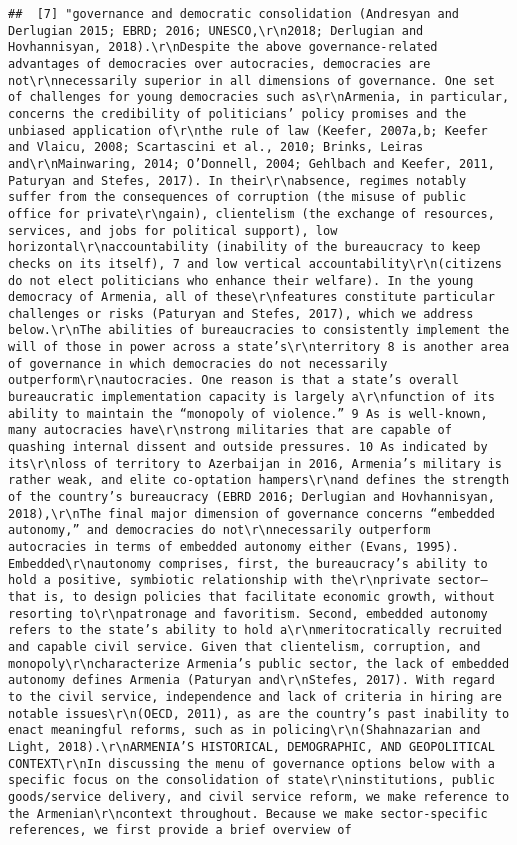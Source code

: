 \documentclass[
]{article}
\begin{document}
\begin{verbatim}
##  [7] "governance and democratic consolidation (Andresyan and Derlugian 2015; EBRD; 2016; UNESCO,\r\n2018; Derlugian and Hovhannisyan, 2018).\r\nDespite the above governance-related advantages of democracies over autocracies, democracies are not\r\nnecessarily superior in all dimensions of governance. One set of challenges for young democracies such as\r\nArmenia, in particular, concerns the credibility of politicians’ policy promises and the unbiased application of\r\nthe rule of law (Keefer, 2007a,b; Keefer and Vlaicu, 2008; Scartascini et al., 2010; Brinks, Leiras and\r\nMainwaring, 2014; O’Donnell, 2004; Gehlbach and Keefer, 2011, Paturyan and Stefes, 2017). In their\r\nabsence, regimes notably suffer from the consequences of corruption (the misuse of public office for private\r\ngain), clientelism (the exchange of resources, services, and jobs for political support), low horizontal\r\naccountability (inability of the bureaucracy to keep checks on its itself), 7 and low vertical accountability\r\n(citizens do not elect politicians who enhance their welfare). In the young democracy of Armenia, all of these\r\nfeatures constitute particular challenges or risks (Paturyan and Stefes, 2017), which we address below.\r\nThe abilities of bureaucracies to consistently implement the will of those in power across a state’s\r\nterritory 8 is another area of governance in which democracies do not necessarily outperform\r\nautocracies. One reason is that a state’s overall bureaucratic implementation capacity is largely a\r\nfunction of its ability to maintain the “monopoly of violence.” 9 As is well-known, many autocracies have\r\nstrong militaries that are capable of quashing internal dissent and outside pressures. 10 As indicated by its\r\nloss of territory to Azerbaijan in 2016, Armenia’s military is rather weak, and elite co-optation hampers\r\nand defines the strength of the country’s bureaucracy (EBRD 2016; Derlugian and Hovhannisyan, 2018),\r\nThe final major dimension of governance concerns “embedded autonomy,” and democracies do not\r\nnecessarily outperform autocracies in terms of embedded autonomy either (Evans, 1995). Embedded\r\nautonomy comprises, first, the bureaucracy’s ability to hold a positive, symbiotic relationship with the\r\nprivate sector—that is, to design policies that facilitate economic growth, without resorting to\r\npatronage and favoritism. Second, embedded autonomy refers to the state’s ability to hold a\r\nmeritocratically recruited and capable civil service. Given that clientelism, corruption, and monopoly\r\ncharacterize Armenia’s public sector, the lack of embedded autonomy defines Armenia (Paturyan and\r\nStefes, 2017). With regard to the civil service, independence and lack of criteria in hiring are notable issues\r\n(OECD, 2011), as are the country’s past inability to enact meaningful reforms, such as in policing\r\n(Shahnazarian and Light, 2018).\r\nARMENIA’S HISTORICAL, DEMOGRAPHIC, AND GEOPOLITICAL CONTEXT\r\nIn discussing the menu of governance options below with a specific focus on the consolidation of state\r\ninstitutions, public goods/service delivery, and civil service reform, we make reference to the Armenian\r\ncontext throughout. Because we make sector-specific references, we first provide a brief overview of 
\end{verbatim}
\end{document}
